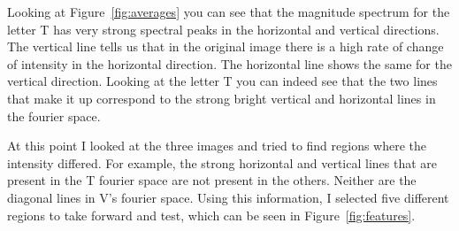 \documentclass[11pt, a4paper]{article}
\begin{document}
Looking at Figure~\ref{fig:averages} you can see that the magnitude spectrum for the letter T has very strong spectral peaks in the horizontal and vertical directions. The vertical line tells us that in the original image there is a high rate of change of intensity in the horizontal direction. The horizontal line shows the same for the vertical direction. Looking at the letter T you can indeed see that the two lines that make it up correspond to the strong bright vertical and horizontal lines in the fourier space. 

At this point I looked at the three images and tried to find regions where the intensity differed. For example, the strong horizontal and vertical lines that are present in the T fourier space are not present in the others. Neither are the diagonal lines in V's fourier space. Using this information, I selected five different regions to take forward and test, which can be seen in Figure~\ref{fig:features}.
\end{document}
